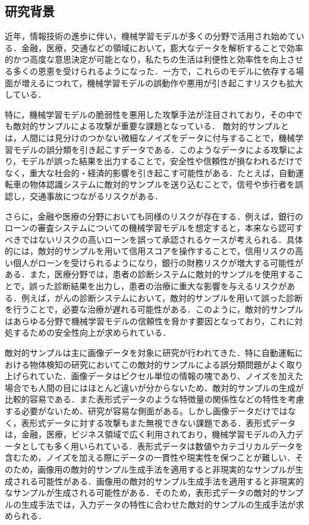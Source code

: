 \subsection{研究背景}
近年，情報技術の進歩に伴い，機械学習モデルが多くの分野で活用され始めている．金融，医療，交通などの領域において，膨大なデータを解析することで効率的かつ高度な意思決定が可能となり，私たちの生活は利便性と効率性を向上させる多くの恩恵を受けられるようになった．一方で，これらのモデルに依存する場面が増えるにつれて，機械学習モデルの誤動作や悪用が引き起こすリスクも拡大している．

特に，機械学習モデルの脆弱性を悪用した攻撃手法が注目されており，その中でも敵対的サンプルによる攻撃が重要な課題となっている．\cite{MBSD-AdversarialTraining}
敵対的サンプルとは，人間には見分けのつかない微細なノイズをデータに付与することで，機械学習モデルの誤分類を引き起こすデータである．\cite{MBSD-AdversarialExample}このようなデータによる攻撃により，モデルが誤った結果を出力することで，安全性や信頼性が損なわれるだけでなく，重大な社会的・経済的影響を引き起こす可能性がある．たとえば，自動運転車の物体認識システムに敵対的サンプルを送り込むことで，信号や歩行者を誤認し，交通事故につながるリスクがある．\cite{AdversarialMachineLearning:BayesianPerspectives}

さらに，金融や医療の分野においても同様のリスクが存在する．例えば，銀行のローンの審査システムについての機械学習モデルを想定すると，本来なら認可すべきではないリスクの高いローンを誤って承認されるケースが考えられる．具体的には，敵対的サンプルを用いて信用スコアを操作することで，信用リスクの高い個人がローンを受けられるようになり，銀行の財務リスクが増大する可能性がある．また，医療分野では，患者の診断システムに敵対的サンプルを使用することで，誤った診断結果を出力し，患者の治療に重大な影響を与えるリスクがある．例えば，がんの診断システムにおいて，敵対的サンプルを用いて誤った診断を行うことで，必要な治療が遅れる可能性がある．このように，敵対的サンプルはあらゆる分野で機械学習モデルの信頼性を脅かす要因となっており，これに対処するための安全性向上が求められている．

敵対的サンプルは主に画像データを対象に研究が行われてきた．特に自動運転における物体検知の研究\cite{MBSD-automobile}においてこの敵対的サンプルによる誤分類問題がよく取り上げられていた．画像データはピクセル単位の情報の塊であり、ノイズを加えた場合でも人間の目にはほとんど違いが分からないため、敵対的サンプルの生成が比較的容易である．また表形式データのような特徴量の関係性などの特性を考慮する必要がないため、研究が容易な側面がある。しかし画像データだけではなく，表形式データに対する攻撃もまた無視できない課題である．表形式データは，金融，医療，ビジネス領域で広く利用されており，機械学習モデルの入力データとしても多く用いられている．表形式データは数値やカテゴリカルデータを含むため，ノイズを加える際にデータの一貫性や現実性を保つことが難しい．そのため，画像用の敵対的サンプル生成手法を適用すると非現実的なサンプルが生成される可能性がある．画像用の敵対的サンプル生成手法を適用すると非現実的なサンプルが生成される可能性がある．そのため，表形式データの敵対的サンプルの生成手法では，入力データの特性に合わせた敵対的サンプルの生成手法が求められる．

